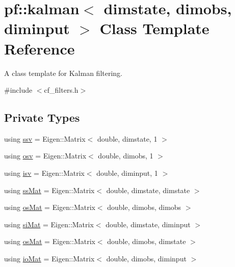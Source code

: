 \hypertarget{classpf_1_1kalman}{}\section{pf\+:\+:kalman$<$ dimstate, dimobs, diminput $>$ Class Template Reference}
\label{classpf_1_1kalman}


A class template for Kalman filtering.  




{\ttfamily \#include $<$cf\+\_\+filters.\+h$>$}

\subsection*{Private Types}
\begin{DoxyCompactItemize}
\item 
using \hyperlink{classpf_1_1kalman_a5b389e6a5e41f4ad81d4ba115d9aa823}{ssv} = Eigen\+::\+Matrix$<$ double, dimstate, 1 $>$
\item 
using \hyperlink{classpf_1_1kalman_a0568355548ed0e2cae065b489b2428c1}{osv} = Eigen\+::\+Matrix$<$ double, dimobs, 1 $>$
\item 
using \hyperlink{classpf_1_1kalman_a6cbcd532087d0b69bcf1825d8d4ac25a}{isv} = Eigen\+::\+Matrix$<$ double, diminput, 1 $>$
\item 
using \hyperlink{classpf_1_1kalman_aff9ecb9b57dfc3f115a372a765781561}{ss\+Mat} = Eigen\+::\+Matrix$<$ double, dimstate, dimstate $>$
\item 
using \hyperlink{classpf_1_1kalman_a41a83764417fa43c3eb0898676791efa}{os\+Mat} = Eigen\+::\+Matrix$<$ double, dimobs, dimobs $>$
\item 
using \hyperlink{classpf_1_1kalman_afc940e82542b4dcce4a0834297d98781}{si\+Mat} = Eigen\+::\+Matrix$<$ double, dimstate, diminput $>$
\item 
using \hyperlink{classpf_1_1kalman_a420f98a9c405f6b05987adafa82e8b52}{os\+Mat} = Eigen\+::\+Matrix$<$ double, dimobs, dimstate $>$
\item 
using \hyperlink{classpf_1_1kalman_a1bef1b09ec25689b765bb57bf1bbbfd6}{io\+Mat} = Eigen\+::\+Matrix$<$ double, dimobs, diminput $>$
\end{DoxyCompactItemize}
